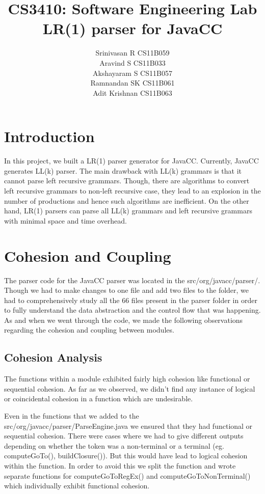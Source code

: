 \documentclass{article}
\begin{document}
\title{\textbf{CS3410: Software Engineering Lab}\\ \textbf{LR(1) parser for JavaCC}}
\author{
	Srinivasan R CS11B059 \\
	Aravind S CS11B033\\
    Akshayaram S CS11B057 \\
    Ramnandan SK CS11B061 \\
    Adit Krishnan CS11B063
}

\maketitle
\section{Introduction}
In this project, we built a LR(1) parser generator for JavaCC. Currently, JavaCC generates LL(k) parser. The main drawback with LL(k) grammars is that it cannot parse left recursive grammars. Though, there are algorithms to convert left recursive grammars to non-left recursive case, they lead to an explosion in the number of productions and hence such algorithms are inefficient. On the other hand, LR(1) parsers can parse all LL(k) grammars and left recursive grammars with minimal space and time overhead. 

\section{Cohesion and Coupling}
The parser code for the JavaCC parser was located in the src/org/javacc/parser/. Though we had to make changes to one file and add two files to the folder, we had to comprehensively study all the 66 files present in the parser folder in order to fully understand the data abstraction and the control flow that was happening. As and when we went through the code, we made the following observations regarding the cohesion and coupling between modules.

\subsection*{Cohesion Analysis}
The functions within a module exhibited fairly high cohesion like functional or sequential cohesion. As far as we observed, we didn't find any instance of logical or coincidental cohesion in a function which are undesirable.

Even in the functions that we added to the src/org/javacc/parser/ParseEngine.java we ensured that they had functional or sequential cohesion. There were cases where we had to give different outputs depending on whether the token was a non-terminal or a terminal (eg. computeGoTo(), buildClosure()). But this would have lead to logical cohesion within the function. In order to avoid this we split the function and wrote separate functions for computeGoToRegEx() and computeGoToNonTerminal() which individually exhibit functional cohesion. 
\end{document}
